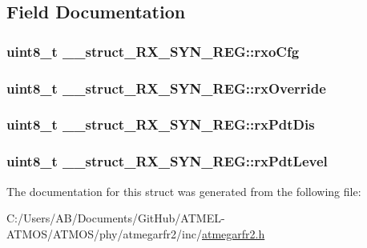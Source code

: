 \subsection{Field Documentation}
\hypertarget{struct____struct___r_x___s_y_n___r_e_g_a1ec158f2017b138c6b270b3f02d836f8}{
\subsubsection[{rxo\-Cfg}]{\setlength{\rightskip}{0pt plus 5cm}uint8\-\_\-t \-\_\-\-\_\-struct\-\_\-\-R\-X\-\_\-\-S\-Y\-N\-\_\-\-R\-E\-G\-::rxo\-Cfg}}\label{struct____struct___r_x___s_y_n___r_e_g_a1ec158f2017b138c6b270b3f02d836f8}
\hypertarget{struct____struct___r_x___s_y_n___r_e_g_a1e6250713d27392559c8b3bf61257b65}{
\subsubsection[{rx\-Override}]{\setlength{\rightskip}{0pt plus 5cm}uint8\-\_\-t \-\_\-\-\_\-struct\-\_\-\-R\-X\-\_\-\-S\-Y\-N\-\_\-\-R\-E\-G\-::rx\-Override}}\label{struct____struct___r_x___s_y_n___r_e_g_a1e6250713d27392559c8b3bf61257b65}
\hypertarget{struct____struct___r_x___s_y_n___r_e_g_a9ff9fc0633b14b6f72fade440e6ab2a2}{
\subsubsection[{rx\-Pdt\-Dis}]{\setlength{\rightskip}{0pt plus 5cm}uint8\-\_\-t \-\_\-\-\_\-struct\-\_\-\-R\-X\-\_\-\-S\-Y\-N\-\_\-\-R\-E\-G\-::rx\-Pdt\-Dis}}\label{struct____struct___r_x___s_y_n___r_e_g_a9ff9fc0633b14b6f72fade440e6ab2a2}
\hypertarget{struct____struct___r_x___s_y_n___r_e_g_a3cb348befbf73dd1cb6278eae7518733}{
\subsubsection[{rx\-Pdt\-Level}]{\setlength{\rightskip}{0pt plus 5cm}uint8\-\_\-t \-\_\-\-\_\-struct\-\_\-\-R\-X\-\_\-\-S\-Y\-N\-\_\-\-R\-E\-G\-::rx\-Pdt\-Level}}\label{struct____struct___r_x___s_y_n___r_e_g_a3cb348befbf73dd1cb6278eae7518733}


The documentation for this struct was generated from the following file\-:\begin{DoxyCompactItemize}
\item 
C\-:/\-Users/\-A\-B/\-Documents/\-Git\-Hub/\-A\-T\-M\-E\-L-\/\-A\-T\-M\-O\-S/\-A\-T\-M\-O\-S/phy/atmegarfr2/inc/\hyperlink{atmegarfr2_8h}{atmegarfr2.\-h}\end{DoxyCompactItemize}
